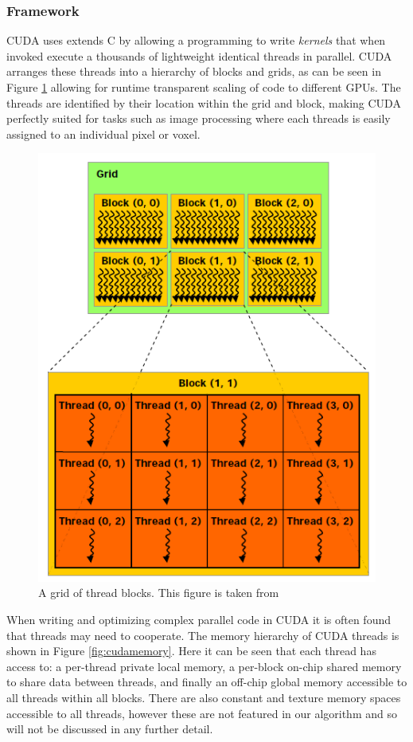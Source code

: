 		\subsubsection{Framework}
CUDA uses extends C by allowing a programming to write \textit{kernels} that when invoked execute a thousands of lightweight identical threads in parallel. CUDA arranges these threads into a hierarchy of blocks and grids, as can be seen in Figure \ref{fig:cudathreads} allowing for runtime transparent scaling of code to different GPUs. The threads are identified by their location within the grid and block, making CUDA perfectly suited for tasks such as image processing where each threads is easily assigned to an individual pixel or voxel.

\begin{figure}[p]
	\centering
		\includegraphics[scale=0.4]{images/cudathreads.PNG}
		\caption{A grid of thread blocks. This figure is taken from \cite{cuda}}
	\label{fig:cudathreads}
\end{figure}

When writing and optimizing complex parallel code in CUDA it is often found that threads may need to cooperate. The memory hierarchy of CUDA threads is shown in Figure \ref{fig:cudamemory}. Here it can be seen that each thread has access to: a per-thread private local memory, a per-block on-chip shared memory to share data between threads, and finally an off-chip global memory accessible to all threads within all blocks. There are also constant and texture memory spaces accessible to all threads, however these are not featured in our algorithm and so will not be discussed in any further detail.

